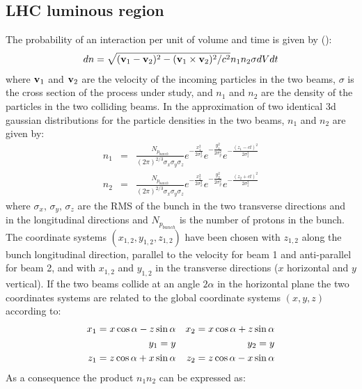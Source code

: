 \documentclass[10pt]{article}
\begin{document}
\subsection{LHC luminous region}
\label{sec:lr}
The probability of an interaction per unit of volume and time is given by (\cite{bib:LandauFT}):
\begin{equation}
dn = \sqrt{({\bf v}_1-{\bf v}_2)^2-({\bf v}_1\times{\bf v}_2)^2/c^2}n_1n_2\sigma dVdt
\end{equation}
where ${\bf v}_1$ and ${\bf v}_2$ are the velocity of the incoming particles in the two beams, $\sigma$ is the cross section of the process under study, and $n_1$ and $n_2$ are the density of the particles in the two colliding beams.
In the approximation of two identical 3d gaussian distributions for the particle densities in the two beams, $n_1$ and $n_2$ are given by:
\begin{eqnarray}
n_1&=&\frac{N_{p_{bunch}}}{(2\pi)^{2/3}\sigma_x\sigma_y\sigma_z}e^{-\frac{x_1^2}{2\sigma_x^2}}e^{-\frac{y_1^2}{2\sigma_y^2}}e^{-\frac{(z_1-ct)^2}{2\sigma_z^2}} \\
n_2&=&\frac{N_{p_{bunch}}}{(2\pi)^{2/3}\sigma_x\sigma_y\sigma_z}e^{-\frac{x_2^2}{2\sigma_x^2}}e^{-\frac{y_2^2}{2\sigma_y^2}}e^{-\frac{(z_2+ct)^2}{2\sigma_z^2}}
\end{eqnarray}
where $\sigma_x,\,\sigma_y,\,\sigma_z$ are the RMS of the bunch in the two transverse directions and in the longitudinal directions and $N_{p_{bunch}}$ is the number of protons in the bunch. The coordinate systems $(x_{1,2},y_{1,2},z_{1,2})$ have been chosen with $z_{1,2}$ along the bunch longitudinal direction, parallel to the velocity for beam 1 and anti-parallel for beam 2, and with $x_{1,2}$ and $y_{1,2}$ in the transverse directions ($x$ horizontal and $y$ vertical).
If the two beams collide at an angle $2\alpha$ in the horizontal plane the two coordinates systems are related to the global coordinate systems $(x,y,z)$ according to:
\begin{eqnarray}
x_1 = x\cos\alpha - z\sin\alpha && x_2 = x\cos\alpha + z \sin\alpha\cr
y_1 = y && y_2 = y\cr
z_1 = z\cos\alpha + x\sin\alpha && z_2 = z\cos\alpha - x \sin\alpha
\end{eqnarray}
As a consequence the product $n_1n_2$ can be expressed as:
\end{document}
